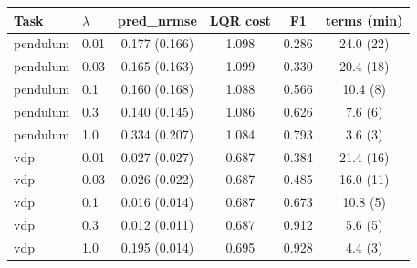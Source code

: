 \begin{tabular}{llcccc}\toprule
Task & $\lambda$ & pred\_nrmse & LQR cost & F1 & terms (min) \\\midrule
pendulum & 0.01 & 0.177 (0.166) & 1.098 & 0.286 & 24.0 (22) \\
pendulum & 0.03 & 0.165 (0.163) & 1.099 & 0.330 & 20.4 (18) \\
pendulum & 0.1 & 0.160 (0.168) & 1.088 & 0.566 & 10.4 (8) \\
pendulum & 0.3 & 0.140 (0.145) & 1.086 & 0.626 & 7.6 (6) \\
pendulum & 1.0 & 0.334 (0.207) & 1.084 & 0.793 & 3.6 (3) \\
\midrule
vdp & 0.01 & 0.027 (0.027) & 0.687 & 0.384 & 21.4 (16) \\
vdp & 0.03 & 0.026 (0.022) & 0.687 & 0.485 & 16.0 (11) \\
vdp & 0.1 & 0.016 (0.014) & 0.687 & 0.673 & 10.8 (5) \\
vdp & 0.3 & 0.012 (0.011) & 0.687 & 0.912 & 5.6 (5) \\
vdp & 1.0 & 0.195 (0.014) & 0.695 & 0.928 & 4.4 (3) \\
\bottomrule\end{tabular}
